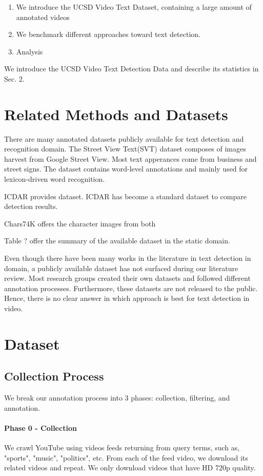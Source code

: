 \documentclass{bmvc2k}
\begin{document}
\begin{enumerate}

\item We introduce the UCSD Video Text Dataset, containing a large amount of annotated videos

\item We benchmark different approaches toward text detection.

\item Analysis
\end{enumerate}

We introduce the UCSD Video Text Detection Data and describe its statistics in Sec. 2.
\section{Related Methods and Datasets}
There are many annotated datasets publicly available for text detection and recognition domain. The Street View Text(SVT) dataset \cite{WangBB11} composes of images harvest from Google Street View. Most text apperances come from business and street signs. The dataset contains word-level annotations and mainly used for lexicon-driven word recognition.

ICDAR provides dataset. ICDAR has become a standard dataset to compare detection results.

Chars74K offers the character images from both

Table ? offer the summary of the available dataset in the static domain.

Even though there have been many works in the literature in text detection in domain, a publicly available dataset has not surfaced during our literature review. Most research groups created their own datasets and followed different annotation processes. Furthermore, these datasets are not released to the public. Hence, there is no clear answer in which approach is best for text detection in video.

\section{Dataset}
\subsection{Collection Process}

We break our annotation process into 3 phases: collection, filtering, and annotation.
\paragraph{Phase 0 - Collection} We crawl YouTube using videos feeds returning from query terms, such as, "sports", "music", "politics", etc. From each of the feed video, we download its related videos and repeat. We only download videos that have HD 720p quality.
\end{document}
